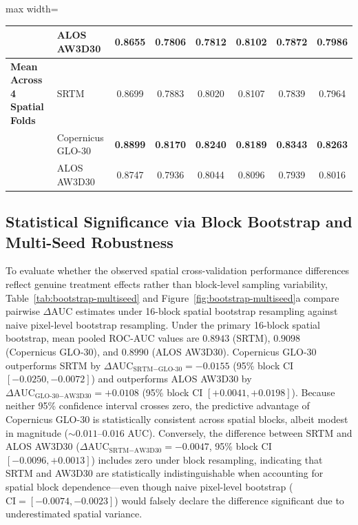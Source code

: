 \documentclass[11pt,twoside]{article}
\begin{document}
\begin{table}[!htbp]
\begin{adjustbox}{max width=\textwidth}
\begin{tabular}{c c c c l cccccc}
  & & & & ALOS AW3D30 & 0.8655 & 0.7806 & 0.7812 & 0.8102 & 0.7872 & 0.7986 \\
\midrule
\multicolumn{4}{l}{\textbf{Mean Across 4 Spatial Folds}} & SRTM & 0.8699 & 0.7883 & 0.8020 & 0.8107 & 0.7839 & 0.7964 \\
\multicolumn{4}{l}{} & Copernicus GLO-30 & \textbf{0.8899} & \textbf{0.8170} & \textbf{0.8240} & \textbf{0.8189} & \textbf{0.8343} & \textbf{0.8263} \\
\multicolumn{4}{l}{} & ALOS AW3D30 & 0.8747 & 0.7936 & 0.8044 & 0.8096 & 0.7939 & 0.8016 \\
\bottomrule
\end{tabular}
\end{adjustbox}
\end{table}

\subsection{Statistical Significance via Block Bootstrap and Multi-Seed Robustness}\label{subsec:bootstrap-multiseed}

To evaluate whether the observed spatial cross-validation performance differences reflect genuine treatment effects rather than block-level sampling variability, Table~\ref{tab:bootstrap-multiseed} and Figure~\ref{fig:bootstrap-multiseed}a compare pairwise $\Delta\text{AUC}$ estimates under 16-block spatial bootstrap resampling against naive pixel-level bootstrap resampling. Under the primary 16-block spatial bootstrap, mean pooled ROC-AUC values are $0.8943$ (SRTM), $0.9098$ (Copernicus GLO-30), and $0.8990$ (ALOS AW3D30). Copernicus GLO-30 outperforms SRTM by $\Delta\text{AUC}_{\text{SRTM}-\text{GLO-30}} = -0.0155$ (95\% block CI $[-0.0250, -0.0072]$) and outperforms ALOS AW3D30 by $\Delta\text{AUC}_{\text{GLO-30}-\text{AW3D30}} = +0.0108$ (95\% block CI $[+0.0041, +0.0198]$). Because neither 95\% confidence interval crosses zero, the predictive advantage of Copernicus GLO-30 is statistically consistent across spatial blocks, albeit modest in magnitude ($\sim 0.011\text{--}0.016$ AUC). Conversely, the difference between SRTM and ALOS AW3D30 ($\Delta\text{AUC}_{\text{SRTM}-\text{AW3D30}} = -0.0047$, 95\% block CI $[-0.0096, +0.0013]$) includes zero under block resampling, indicating that SRTM and AW3D30 are statistically indistinguishable when accounting for spatial block dependence---even though naive pixel-level bootstrap ($\text{CI} = [-0.0074, -0.0023]$) would falsely declare the difference significant due to underestimated spatial variance.
\end{document}
